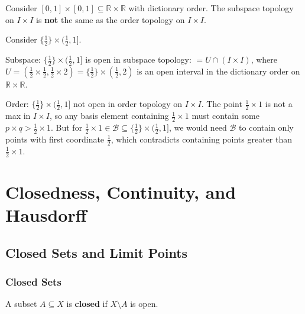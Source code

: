 \documentclass[11pt]{report}
\begin{document}
\begin{exbox}
Consider $[0,1] \times [0,1] \subseteq \mathbb{R} \times \mathbb{R}$ with dictionary order. The subspace topology on $I \times I$ is \textbf{not} the same as the order topology on $I \times I$.

Consider $\{\frac{1}{2}\} \times (\frac{1}{2}, 1]$. 

Subspace: $\{\frac{1}{2}\} \times (\frac{1}{2}, 1]$ is open in subspace topology: $= U \cap (I \times I)$, where $U = (\frac{1}{2} \times \frac{1}{2}, \frac{1}{2} \times 2) = \{\frac{1}{2}\} \times (\frac{1}{2}, 2)$ is an open interval in the dictionary order on $\mathbb{R} \times \mathbb{R}$.

Order: $\{\frac{1}{2}\} \times (\frac{1}{2}, 1]$ not open in order topology on $I \times I$. The point $\frac{1}{2} \times 1$ is not a max in $I \times I$, so any basis element containing $\frac{1}{2} \times 1$ must contain some $p \times q > \frac{1}{2} \times 1$. But for $\frac{1}{2} \times 1 \in \mathcal{B} \subseteq \{\frac{1}{2}\} \times (\frac{1}{2}, 1]$, we would need $\mathcal{B}$ to contain only points with first coordinate $\frac{1}{2}$, which contradicts containing points greater than $\frac{1}{2} \times 1$.
\end{exbox}

\chapter{Closedness, Continuity, and Hausdorff}

\section{Closed Sets and Limit Points}

\subsection{Closed Sets}

\begin{defbox}
A subset $A \subseteq X$ is \textbf{closed} if $X \setminus A$ is open.
\end{defbox}
\end{document}
